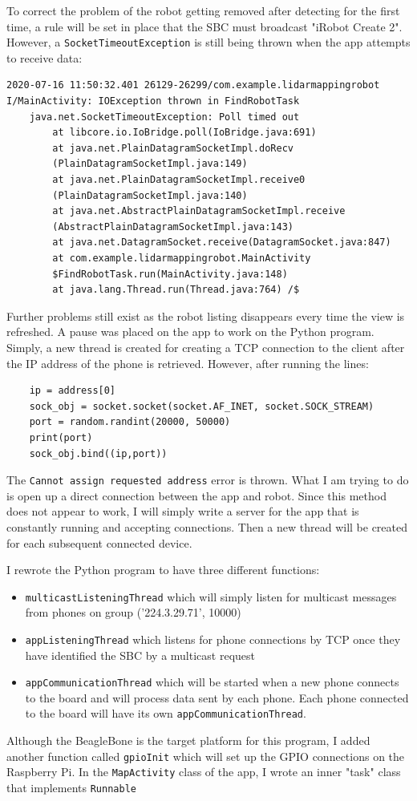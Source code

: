 \documentclass[fontsize=11pt, %
                             paper=a4, %
                             twoside, %
                             captions=tableheading,
                             index=totoc,
                             hyperref]{labbook}
\begin{document}
\begin{addmargin}[0cm]{0cm}
To correct the problem of the robot getting removed after detecting for the first time, a rule will be set in place that the SBC must broadcast "iRobot Create 2". However, a \texttt{SocketTimeoutException} is still being thrown when the app attempts to receive data:
\begin{Verbatim}
2020-07-16 11:50:32.401 26129-26299/com.example.lidarmappingrobot 
I/MainActivity: IOException thrown in FindRobotTask
    java.net.SocketTimeoutException: Poll timed out
        at libcore.io.IoBridge.poll(IoBridge.java:691)
        at java.net.PlainDatagramSocketImpl.doRecv
        (PlainDatagramSocketImpl.java:149)
        at java.net.PlainDatagramSocketImpl.receive0
        (PlainDatagramSocketImpl.java:140)
        at java.net.AbstractPlainDatagramSocketImpl.receive
        (AbstractPlainDatagramSocketImpl.java:143)
        at java.net.DatagramSocket.receive(DatagramSocket.java:847)
        at com.example.lidarmappingrobot.MainActivity
        $FindRobotTask.run(MainActivity.java:148)
        at java.lang.Thread.run(Thread.java:764) /$
\end{Verbatim}
Further problems still exist as the robot listing disappears every time the view is refreshed. 
\medbreak\noindent
A pause was placed on the app to work on the Python program. Simply, a new thread is created for creating a TCP connection to the client after the IP address of the phone is retrieved. However, after running the lines:
\begin{Verbatim}
	ip = address[0]
	sock_obj = socket.socket(socket.AF_INET, socket.SOCK_STREAM)
	port = random.randint(20000, 50000)
	print(port)
	sock_obj.bind((ip,port))	
\end{Verbatim}
The \texttt{Cannot assign requested address} error is thrown. What I am trying to do is open up a direct connection between the app and robot. Since this method does not appear to work, I will simply write a server for the app that is constantly running and accepting connections. Then a new thread will be created for each subsequent connected device.

I rewrote the Python program to have three different functions:
\begin{itemize}
\item \texttt{multicastListeningThread} which will simply listen for multicast messages from phones on group ('224.3.29.71', 10000)
\item \texttt{appListeningThread} which listens for phone connections by TCP once they have identified the SBC by a multicast request
\item \texttt{appCommunicationThread} which will be started when a new phone connects to the board and will process data sent by each phone. Each phone connected to the board will have its own \texttt{appCommunicationThread}.
\end{itemize}
Although the BeagleBone is the target platform for this program, I added another function called \texttt{gpioInit} which will set up the GPIO connections on the Raspberry Pi. 
\medbreak\noindent
In the \texttt{MapActivity} class of the app, I wrote an inner "task" class that implements \texttt{Runnable}


\end{addmargin}
\end{document}
